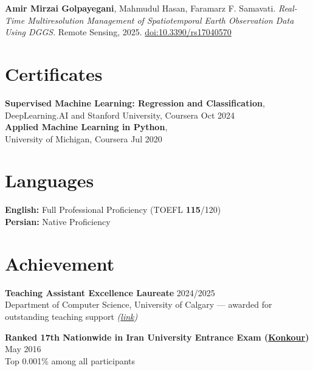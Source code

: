 \documentclass[a4paper,10pt]{article}
\begin{document}
\textbf{Amir Mirzai Golpayegani}, Mahmudul Hasan, Faramarz F. Samavati. 
\textit{Real-Time Multiresolution Management of Spatiotemporal Earth Observation Data Using DGGS}. 
Remote Sensing, 2025. \href{https://doi.org/10.3390/rs17040570}{doi:10.3390/rs17040570}


\section*{Certificates}

\textbf{Supervised Machine Learning: Regression and Classification},\\
DeepLearning.AI and Stanford University, Coursera 
\hfill Oct 2024 \\
\textbf{Applied Machine Learning in Python},\\
University of Michigan, Coursera 
\hfill Jul 2020


\section*{Languages}

\textbf{English:} Full Professional Proficiency (TOEFL \textbf{115}/120) \\
\textbf{Persian:} Native Proficiency

\section*{Achievement}

\textbf{Teaching Assistant Excellence Laureate} \hfill 2024/2025 \\
Department of Computer Science, University of Calgary --- awarded for outstanding teaching support \textit{(\href{https://science.ucalgary.ca/computer-science/about/our-department/ta-recognition-2024-2025}{link})}

\vspace{0.35em}

\textbf{Ranked 17th Nationwide in Iran University Entrance Exam (\href{https://en.wikipedia.org/wiki/Iranian_University_Entrance_Exam}{Konkour})} \hfill May 2016 \\
Top 0.001\% among all participants
\end{document}
